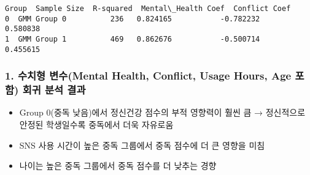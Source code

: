 \documentclass[11pt]{article}
\makeatletter
\providecommand{\tightlist}{%
      \setlength{\itemsep}{0pt}\setlength{\parskip}{0pt}}
\newcommand{\boxspacing}{\kern\kvtcb@left@rule\kern\kvtcb@boxsep}
\newcommand{\prompt}[4]{
        {\ttfamily\llap{{\color{#2}[#3]:\hspace{3pt}#4}}\vspace{-\baselineskip}}
    }
\makeatother
\begin{document}
            \begin{tcolorbox}[breakable, size=fbox, boxrule=.5pt, pad at break*=1mm, opacityfill=0]
\prompt{Out}{outcolor}{15}{\boxspacing}
\begin{Verbatim}[commandchars=\\\{\}]
         Group  Sample Size  R-squared  Mental\_Health Coef  Conflict Coef
0  GMM Group 0          236   0.824165           -0.782232       0.580838
1  GMM Group 1          469   0.862676           -0.500714       0.455615
\end{Verbatim}
\end{tcolorbox}
        
    \subsubsection{1. 수치형 변수(Mental Health, Conflict, Usage Hours, Age
포함) 회귀 분석
결과}\label{uxc218uxce58uxd615-uxbcc0uxc218mental-health-conflict-usage-hours-age-uxd3ecuxd568-uxd68cuxadc0-uxbd84uxc11d-uxacb0uxacfc}

\begin{itemize}
\tightlist
\item
  Group 0(중독 낮음)에서 정신건강 점수의 부적 영향력이 훨씬 큼 →
  정신적으로 안정된 학생일수록 중독에서 더욱 자유로움
\item
  SNS 사용 시간이 높은 중독 그룹에서 중독 점수에 더 큰 영향을 미침
\item
  나이는 높은 중독 그룹에서 중독 점수를 더 낮추는 경향
\end{itemize}
\end{document}
